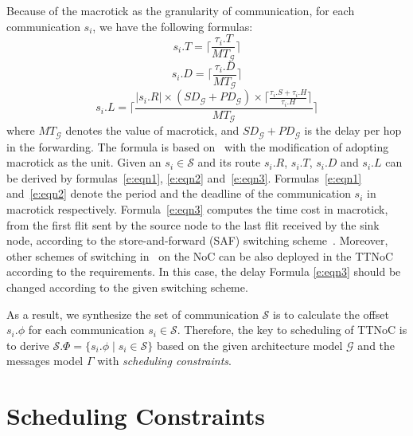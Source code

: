 \documentclass[journal]{IEEEtran}
\newcommand{\calG}{\mathcal{G}}
\newcommand{\calS}{\mathcal{S}}
\newcommand{\SD}{\mathit{SD}_\calG}
\newcommand{\HD}{\mathit{PD}_\calG}
\newcommand{\MT}{\mathit{MT}_\calG}
\theoremstyle{remark}
\begin{document}
Because of the macrotick as the granularity of communication,
 for each communication $s_{i}$,
   we have the following formulas:
\begin{equation}
\label{e:eqn1}
  s_i.T = \lceil\frac{\tau_{i}.T}{\MT} \rceil
\end{equation}
\begin{equation}
\label{e:eqn2}
  s_i.D = \lceil\frac{\tau_{i}.D}{\MT}\rceil
\end{equation}
\begin{equation}
\label{e:eqn3}
  s_i.L = \lceil\frac{|s_i.R| \times (\SD+\HD) \times
    \lceil\frac{\tau_{i}.S + \tau_{i}.H}{\tau_{i}.H  }\rceil}{\MT}\rceil
\end{equation}   
where $\MT$ denotes the value of macrotick,
 and $\SD+\HD$ is the delay per hop in the forwarding.
The formula is based on~\cite{DBLP:books/daglib/0087651} with the modification of adopting macrotick as the unit.  
Given an $s_{i}\in\calS$ and its route $s_i.R$,
 $s_i.T$,
  $s_i.D$ and $s_i.L$ can be derived by formulas~\ref{e:eqn1},
   \ref{e:eqn2} and~\ref{e:eqn3}.
Formulas~\ref{e:eqn1} and~\ref{e:eqn2} denote the period and the deadline of the communication $s_i$ in macrotick respectively. 
Formula~\ref{e:eqn3} computes the time cost in
macrotick, from the first flit sent by the source node to the last
flit received by the sink node, according to the store-and-forward
(SAF) switching scheme~\cite{DBLP:books/daglib/0087651}.  
Moreover, other schemes of switching in~  \cite{DBLP:books/daglib/0087651} on the NoC can be also deployed in the TTNoC
according to the requirements. 
In this case, the delay Formula \ref{e:eqn3} should be changed according to the given switching scheme.

As a result, we synthesize the set of communication $\calS$ is to
calculate the offset $s_i.\phi$ for each communication
$s_i\in\calS$. Therefore, the key to scheduling of TTNoC is to derive
$\calS.\Phi = \{s_i.\phi\mid s_i\in\calS\}$ based on the given
architecture model $\calG$ and the messages model $\Gamma$ with
\emph{scheduling constraints}.


\section{Scheduling Constraints\label{s:constraint}}
\end{document}
